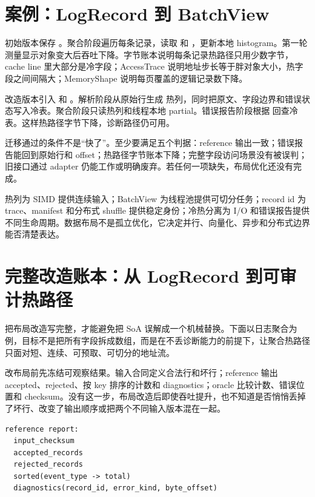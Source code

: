 \section{案例：LogRecord 到 BatchView}

初始版本保存 。聚合阶段遍历每条记录，读取  和 ，更新本地 histogram。第一轮测量显示对象变大后吞吐下降。字节账本说明每条记录热路径只用少数字节，cache line 里大部分是冷字段；AccessTrace 说明地址步长等于胖对象大小，热字段之间间隔大；MemoryShape 说明每页覆盖的逻辑记录数下降。

改造版本引入  和 。解析阶段从原始行生成  热列，同时把原文、字段边界和错误状态写入冷表。聚合阶段只读热列和线程本地 partial。错误报告阶段根据  回查冷表。这样热路径字节下降，诊断路径仍可用。

迁移通过的条件不是“快了”。至少要满足五个判据：reference 输出一致；错误报告能回到原始行和 offset；热路径字节账本下降；完整字段访问场景没有被误判；旧接口通过 adapter 仍能工作或明确废弃。若任何一项缺失，布局优化还没有完成。

热列为 SIMD 提供连续输入；BatchView 为线程池提供可切分任务；record id 为 trace、manifest 和分布式 shuffle 提供稳定身份；冷热分离为 I/O 和错误报告提供不同生命周期。数据布局不是孤立优化，它决定并行、向量化、异步和分布式边界能否清楚表达。

\section{完整改造账本：从 LogRecord 到可审计热路径}

把布局改造写完整，才能避免把 SoA 误解成一个机械替换。下面以日志聚合为例，目标不是把所有字段拆成数组，而是在不丢诊断能力的前提下，让聚合热路径只面对短、连续、可预取、可切分的地址流。

改布局前先冻结可观察结果。输入合同定义合法行和坏行；reference 输出 accepted、rejected、按 key 排序的计数和 diagnostics；oracle 比较计数、错误位置和 checksum。没有这一步，布局改造后即使吞吐提升，也不知道是否悄悄丢掉了坏行、改变了输出顺序或把两个不同输入版本混在一起。

\begin{lstlisting}[numbers=none,caption={布局改造前必须固定的语义字段}]
reference report:
  input_checksum
  accepted_records
  rejected_records
  sorted(event_type -> total)
  diagnostics(record_id, error_kind, byte_offset)
\end{lstlisting}

